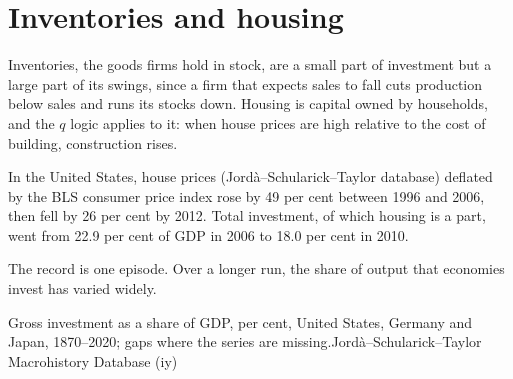 \section{Inventories and housing}\label{sec:b2:investment:housing}

Inventories, the goods firms hold in stock, are a small part of investment but a large part of its swings, since a firm
that expects sales to fall cuts production below sales and runs its stocks down. Housing is capital owned by households,
and the $q$ logic applies to it: when house prices are high relative to the cost of building, construction rises.

\begin{record}[Housing investment around 2006]
In the United States, house prices (Jord\`a--Schularick--Taylor database) deflated by the BLS consumer price index rose by 49 per cent between 1996 and 2006, then fell by 26
per cent by 2012. Total investment, of which housing is a part, went from 22.9 per cent of GDP in 2006 to 18.0 per cent in 2010.
\end{record}

The record is one episode. Over a longer run, the share of output that economies invest has varied widely.

\begin{omchart}{Gross investment as a share of GDP, per cent, United States, Germany and Japan, 1870--2020; gaps where
  the series are missing.}{Jord\`a--Schularick--Taylor Macrohistory Database (iy)}
\end{omchart}


